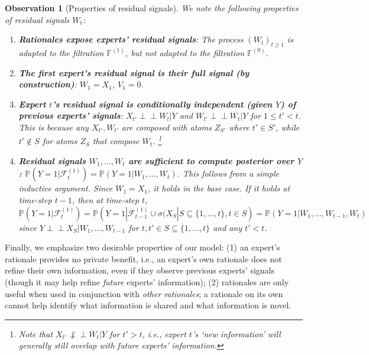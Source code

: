 \documentclass{winnower}
\newtheorem{observation}{Observation}
\newcommand{\ind}{\perp\!\!\!\!\perp}
\begin{document}
\begin{observation}[Properties of residual signals]\label{obs:resprop}
    We note the following properties of residual signals $W_t$:

\begin{enumerate}
\item \textbf{Rationales expose experts' residual signals}: The process $(W_t)_{t\geq 1}$ is adapted to the filtration $\mathbb{F}^{(1)}$, but not adapted to the filtration $\mathbb{F}^{(0)}$.
\item \textbf{The first expert's residual signal is their full signal (by construction)}: $W_1 = X_1$, $V_1 = 0$.
    \item \textbf{Expert $t$'s residual signal is conditionally independent (given $Y$) of previous experts' signals}: $X_{t'} \ind W_t|Y$ and $W_{t'} \ind W_t |Y$  for $1 \leq t' < t$. This is because any $X_{t'}, W_{t'}$ are composed with atoms $Z_{S'}$ where $t' \in S'$, while $t' \notin S$ for atoms $Z_S$ that compose $W_t$. \footnote{Note that $X_{t'} \not\ind W_t|Y$ for $t' > t$, i.e., expert $t$'s `new information' will generally still overlap with future experts' information.}
    \item \textbf{Residual signals $W_1, \ldots, W_t$ are sufficient to compute posterior over $Y$: $\mathbb{P}\left(Y=1|\mathcal{F}_t^{(1)}\right) = \mathbb{P}(Y=1| W_1, \ldots, W_t)$}.  This follows from a simple inductive argument. Since $W_1 = X_1$, it holds in the base case. If it holds at time-step $t-1$, then at time-step $t$,
    {\small
    \begin{equation}
        \mathbb{P}\left(Y=1 | \mathcal{F}_t^{(1)}\right) = \mathbb{P}\left(Y=1 | \mathcal{F}_{t-1}^{(1)} \cup \sigma(X_S | S \subseteq \{1, \ldots, t\}, t\in S \right) = \mathbb{P}(Y=1|W_1, \ldots, W_{t-1}, W_t)
    \end{equation}
    }
    since $Y \ind X_S | W_{1}, \ldots, W_{t-1}$ for $t, t' \in S \subseteq \{1, \ldots, t\}$ and any $t' < t$.
    \end{enumerate}
\end{observation}

Finally, we emphasize two desirable properties of our model: (1) an expert's rationale provides no private benefit, i.e., an expert's own rationale does not refine their own information, even if they observe previous experts' signals (though it may help refine \emph{future} experts' information); (2) rationales are only useful when used in conjunction with \emph{other rationales}; a rationale on its own cannot help identify what information is shared and what information is novel.
\end{document}
